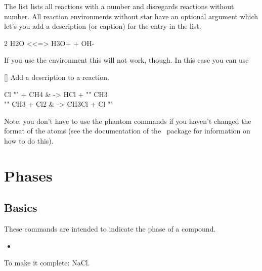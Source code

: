 \documentclass[load-preamble+]{cnltx-doc}
\begin{document}
The list lists all reactions with a number and disregards reactions without
number.  All reaction environments without star have an optional argument
which let's you add a description (or caption) for the entry in the list.
\begin{example}
  \begin{reaction}[Autoprotolyse]
    2 H2O <<=> H3O+ + OH-
  \end{reaction}
\end{example}

If you use the  environment this will not work, though.  In
this case you can use
\begin{commands}
  []
    Add a description to a reaction.
\end{commands}

\begin{example}
  \begin{reactions}
    Cl "" + CH4  &
      -> HCl + "" CH3  \\
    "" CH3 + Cl2 &
      -> CH3Cl + Cl "" 
  \end{reactions}
\end{example}

Note: you don't have to use the phantom commands if you haven't changed the
format of the atoms (see the documentation of the \chemformula\ package for
information on how to do this).

\section{Phases}\label{sec:phasen}
\subsection{Basics}

These commands are intended to indicate the phase of a compound.
\begin{itemize}
  \item[]
     \sld \quad
     \lqd \quad
     \gas \quad
     \aq
\end{itemize}

\begin{example}
  \par
  To make it complete: NaCl\aq.
\end{example}
\end{document}
